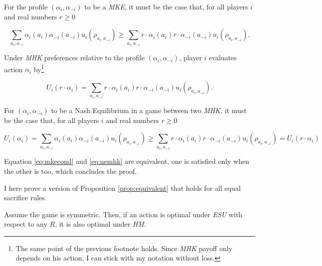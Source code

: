 \begin{mkeproof}
	For the profile \((\alpha_i,\alpha_{-i})\) to be a \textit{MKE}, it must be the case that, for all players \( i \) and real numbers \( r \geq 0 \)

	\begin{equation}\label{eq:mkecond}
		\sum_{a_i, a_{-i}} \alpha_{i} (a_i) \alpha_{-i} (a_{-i}) u_i(\rho_{a_i, a_{-i}}) \geq \sum_{a_i, a_{-i}} r \cdot \alpha_{i} (a_i) r \cdot \alpha_{-i} (a_{-i}) u_i(\rho_{a_i, a_{-i}}).
	\end{equation}

	Under \textit{MHK} preferences relative to the profile \((\alpha_i,\alpha_{-i})\), player \(i\) evaluates action \(\alpha_i\) by\footnote{The same point of the previous footnote holds. Since \textit{MHK} payoff only depends on his action, I can stick with my notation without loss.}

	\[
		U_i \left( r \cdot \alpha_{i} \right) = \sum_{a_i, a_{-i}} r \cdot \alpha_{i} (a_i) r \cdot \alpha_{-i} (a_{-i}) u_i(\rho_{a_i, a_{-i}}).
	\]

	For \((\alpha_i,\alpha_{-i})\) to be a Nash Equilibrium in a game between two \textit{MHK}, it must be the case that, for all players \( i \) and real numbers \( r \geq 0 \)

	\begin{equation}\label{eq:nemhk}
		U_i(\alpha_i) = \sum_{a_i, a_{-i}} \alpha_i (a_i) \alpha_{-i} (a_{-i}) u_i(\rho_{a_i, a_{-i}}) \geq \sum_{a_i, a_{-i}} r \cdot \alpha_{i} (a_i) r \cdot \alpha_{-i} (a_{-i}) u_i(\rho_{a_i, a_{-i}}) = U_i (r \cdot \alpha_i)
	\end{equation}

	Equation \eqref{eq:mkecond} and \eqref{eq:nemhk} are equivalent, one is satisfied only when the other is too, which concludes the proof.
\end{mkeproof}

I here prove a version of Proposition \ref{prop:equivalent} that holds for all equal sacrifice rules.

\begin{prop}\label{prop:equivalentapp}
	Assume the game is symmetric. Then, if an action is optimal under \textit{ESU} with respect to any \( R \), it is also optimal under \textit{HM}.
\end{prop}

